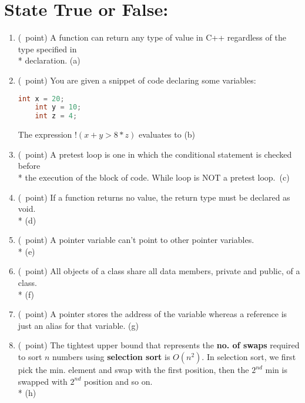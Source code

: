 \documentclass[14pt]{article}
\begin{document}
\section{State True or False:}
\begin{enumerate}[label=\alph*)]
    \item (\textonequarter\ point) A function can return any type of value in C++ regardless of the type specified in \\* declaration.
    \hfill (a) \underline{\hspace{5cm}}
    
    \item (\textonequarter\ point) You are given a snippet of code declaring some variables:
    \begin{lstlisting}[language=C++, title={Part (b)}]
    int x = 20;
    int y = 10;
    int z = 4;
    \end{lstlisting}
    The expression \underline{$!(x + y > 8*z)$} evaluates to 
    \hfill (b) \underline{\hspace{5cm}}
    
    \item (\textonequarter\ point) A pretest loop is one in which the conditional statement is checked before \\* the execution of the block of code. While loop is NOT a pretest loop.\ \hfill (c) \underline{\hspace{3cm}}
    
    \item (\textonequarter\ point) If a function returns no value, the return type must be declared as void. \\*
    \hfill (d) \underline{\hspace{5cm}}
    
    \item (\textonequarter\ point) A pointer variable can't point to other pointer variables. \\*
    \hfill (e) \underline{\hspace{5cm}}
    
    \item (\textonequarter\ point) All objects of a class share all data members, private and public, of a class. \\*
    \hfill (f) \underline{\hspace{5cm}}
    
    \item (\textonequarter\ point) A pointer stores the address of the variable whereas a reference is just an alias for that variable.
    \hfill (g) \underline{\hspace{5cm}}
    
    \item (\textonequarter\ point) The tightest upper bound that represents the \textbf{no. of swaps} required to sort $n$ numbers using \textbf{selection sort} is $O(n^2)$. In selection sort, we first pick the min. element and swap with the first position, then the $2^{nd}$ min is swapped with $2^{nd}$ position and so on. \\*
    \hfill (h) \underline{\hspace{3cm}}
\end{enumerate}
\end{document}
